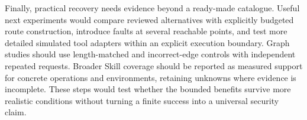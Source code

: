 Finally, practical recovery needs evidence beyond a ready-made catalogue.
Useful next experiments would compare reviewed alternatives with explicitly
budgeted route construction, introduce faults at several reachable points, and
test more detailed simulated tool adapters within an explicit execution boundary.
Graph studies should use length-matched and incorrect-edge controls with
independent repeated requests. Broader Skill coverage should be reported as
measured support for concrete operations and environments, retaining unknowns
where evidence is incomplete. These steps would test whether the bounded
benefits survive more realistic conditions without turning a finite success
into a universal security claim.
